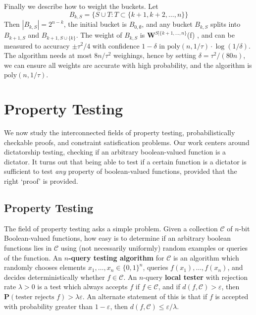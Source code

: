 Finally we describe how to weight the buckets. Let
%
\[ B_{k,S} = \{ S \cup T : T \subset \{ k + 1, k + 2, \dots, n \} \} \]
%
Then $|B_{k,S}| = 2^{n-k}$, the initial bucket is $B_{0,\emptyset}$, and any bucket $B_{k,S}$ splits into $B_{k+1,S}$ and $B_{k+1, S \cup \{ k \}}$. The weight of $B_{k,S}$ is $\mathbf{W}^{S|\{ k+1, \dots, n \}}$(f)
, and can be measured to accuracy $\pm \tau^2/4$ with confidence $1-\delta$ in $\text{poly}(n,1/\tau) \cdot \log(1/\delta)$. The algorithm needs at most $8n/\tau^2$ weighings, hence by setting $\delta = \tau^2/(80n)$, we can ensure all weights are accurate with high probability, and the algorithm is $\text{poly}(n,1/\tau)$.



\chapter{Property Testing}

We now study the interconnected fields of property testing, probabilistically checkable proofs, and constraint satisfication problems. Our work centers around dictatorship testing, checking if an arbitrary boolean-valued function is a dictator. It turns out that being able to test if a certain function is a dictator is sufficient to test {\it any} property of boolean-valued functions, provided that the right `proof' is provided.

\section{Property Testing}

The field of property testing asks a simple problem. Given a collection $\mathcal{C}$ of $n$-bit Boolean-valued functions, how easy is to determine if an arbitrary boolean functions lies in $\mathcal{C}$ using (not necessarily uniformly) random examples or queries of the function. An {\bf $n$-query testing algorithm} for $\mathcal{C}$ is an algorithm which randomly chooses elements $x_1, \dots, x_n \in \{ 0, 1 \}^n$, queries $f(x_1), \dots, f(x_n)$, and decides deterministically whether $f \in \mathcal{C}$. An $n$-query {\bf local tester} with rejection rate $\lambda > 0$ is a test which always accepts $f$ if $f \in \mathcal{C}$, and if $d(f,\mathcal{C}) > \varepsilon$, then $\mathbf{P}(\text{tester rejects $f$}) > \lambda \varepsilon$. An alternate statement of this is that if $f$ is accepted with probability greater than $1 - \varepsilon$, then $d(f,\mathcal{C}) \leq \varepsilon/\lambda$.

